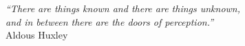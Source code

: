 \cleardoublepage
\thispagestyle{plain}

\vspace*{8cm}

\begin{flushright}
   \textsl{``There are things known and there are things unknown, \\
           and in between there are the doors of perception.''} \\
\vspace*{1.5cm}
        Aldous Huxley
\end{flushright}
